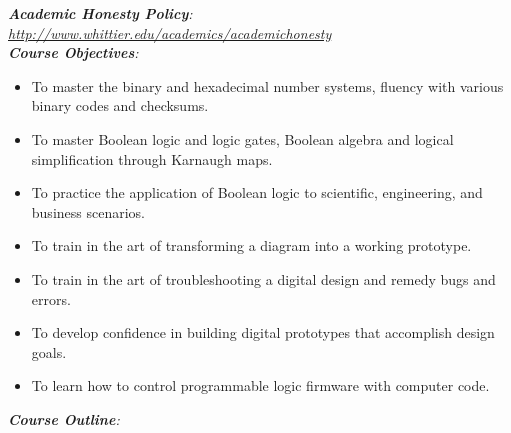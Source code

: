 \documentclass[10pt]{article}
\begin{document}
\textit{\textbf{Academic Honesty Policy}: \url{http://www.whittier.edu/academics/academichonesty}} \\
\textit{\textbf{Course Objectives}:}
\begin{itemize}
\item To master the binary and hexadecimal number systems, fluency with various binary codes and checksums.
\item To master Boolean logic and logic gates, Boolean algebra and logical simplification through Karnaugh maps.
\item To practice the application of Boolean logic to scientific, engineering, and business scenarios.
\item To train in the art of transforming a diagram into a working prototype.
\item To train in the art of troubleshooting a digital design and remedy bugs and errors.
\item To develop confidence in building digital prototypes that accomplish design goals.
\item To learn how to control programmable logic firmware with computer code.
\end{itemize}
\clearpage
\textit{\textbf{Course Outline}:}
\end{document}
